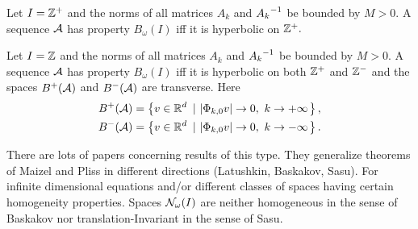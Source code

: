 \begin{theoremnon}  \label{thm:Maizelcor}
Let $I=\mathbb Z^+$ and the norms of all matrices $A_k$ and ${A_k}^{-1}$ be bounded by $M>0.$ A sequence $\mathcal{A}$ has property $B_\omega(I)$ iff it is hyperbolic on  $\mathbb Z^+.$
\end{theoremnon}

\begin{theoremnon}  \label{thm:mainpliscor}
Let $I=\mathbb Z$ and the norms of all matrices $A_k$ and ${A_k}^{-1}$ be bounded by $M>0.$ A sequence $\mathcal{A}$ has property $B_\omega(I)$ iff it is hyperbolic on both  $\mathbb Z^+$ and $\mathbb Z^-$ and the spaces $B^+(\mathcal{A})$ and $B^-(\mathcal{A})$ are transverse. Here
\begin{eqnarray*}
B^+(\mathcal{A})=\left\{ v\in\mathbb R^d\ \left|\ \left| \Phi_{k,0}v \right|\to 0,\ k\to +\infty \right.\right\}, \\
B^-(\mathcal{A})=\left\{ v\in\mathbb R^d\ \left|\ \left| \Phi_{k,0}v \right|\to 0,\ k\to -\infty \right.\right\}.
\end{eqnarray*}
\end{theoremnon}

There are lots of papers concerning results of this type. They generalize theorems of Maizel and Pliss in different directions (Latushkin, Baskakov, Sasu). For infinite dimensional equations and/or different classes of spaces having certain homogeneity properties. Spaces $\mathcal{N}_\omega(I)$ are neither homogeneous in the sense of Baskakov nor translation-Invariant in the sense of Sasu. 